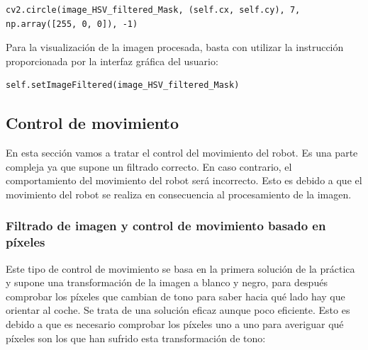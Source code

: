 \lstset{language=Python, breaklines=true, basicstyle=\footnotesize}
\begin{lstlisting}[frame=single]
cv2.circle(image_HSV_filtered_Mask, (self.cx, self.cy), 7, np.array([255, 0, 0]), -1)
\end{lstlisting}

Para la visualización de la imagen procesada, basta con utilizar la instrucción proporcionada por la interfaz gráfica del usuario:

\lstset{language=Python, breaklines=true, basicstyle=\footnotesize}
\begin{lstlisting}[frame=single]
self.setImageFiltered(image_HSV_filtered_Mask)
\end{lstlisting}

\subsection{Control de movimiento}
En esta sección vamos a tratar el control del movimiento del robot. Es una parte compleja ya que supone un filtrado correcto. En caso contrario, el comportamiento del movimiento del robot será incorrecto. Esto es debido a que el movimiento del robot se realiza en consecuencia al procesamiento de la imagen.

\subsubsection{Filtrado de imagen y control de movimiento basado en píxeles} \label{subsec.ficmbp}
Este tipo de control de movimiento se basa en la primera solución de la práctica y supone una transformación de la imagen a blanco y negro, para después comprobar los píxeles que cambian de tono para saber hacia qué lado hay que orientar al coche.
Se trata de una solución eficaz aunque poco eficiente. Esto es debido a que es necesario comprobar los píxeles uno a uno para averiguar qué píxeles son los que han sufrido esta transformación de tono:


